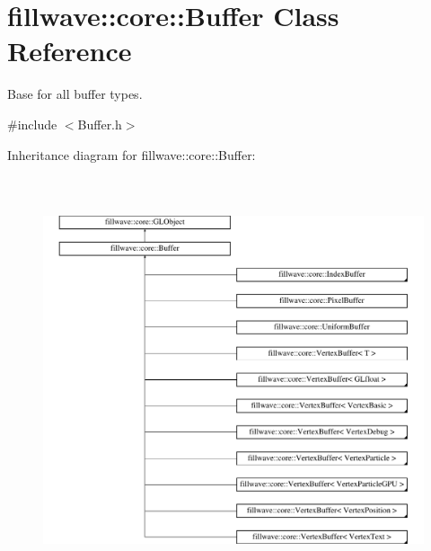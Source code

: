 \hypertarget{classfillwave_1_1core_1_1Buffer}{}\section{fillwave\+:\+:core\+:\+:Buffer Class Reference}
\label{classfillwave_1_1core_1_1Buffer}


Base for all buffer types.  




{\ttfamily \#include $<$Buffer.\+h$>$}

Inheritance diagram for fillwave\+:\+:core\+:\+:Buffer\+:\begin{figure}[H]
\begin{center}
\leavevmode
\includegraphics[height=12.000000cm]{classfillwave_1_1core_1_1Buffer}
\end{center}
\end{figure}
